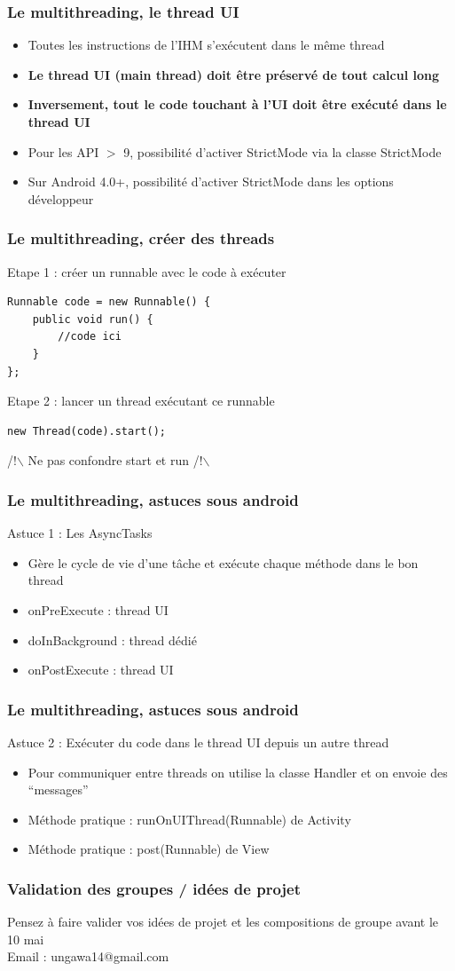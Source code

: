 \documentclass{beamer}
\begin{document}
\begin{frame}[fragile] 
\frametitle{Le multithreading, le thread UI}
\begin{itemize}
  \item Toutes les instructions de l'IHM s'exécutent dans le même thread
  \item \textbf{Le thread UI (main thread) doit être préservé de tout calcul
  long}
  \item \textbf{Inversement, tout le code touchant à l'UI doit être exécuté dans le thread UI}
  \item Pour les API $>$ 9, possibilité d'activer StrictMode via la classe StrictMode
  \item Sur Android 4.0+, possibilité d'activer StrictMode dans les options développeur
\end{itemize}
\end{frame}
\begin{frame}[fragile] 
\frametitle{Le multithreading, créer des threads}
Etape 1 : créer un runnable avec le code à exécuter
\begin{lstlisting}
Runnable code = new Runnable() {
    public void run() {
        //code ici
    }
};
\end{lstlisting}
Etape 2 : lancer un thread exécutant ce runnable
\begin{lstlisting}
new Thread(code).start();
\end{lstlisting}
/!$\backslash$ Ne pas confondre start et run /!$\backslash$
\end{frame}
\begin{frame}[fragile] 
\frametitle{Le multithreading, astuces sous android}
Astuce 1 : Les AsyncTasks
\begin{itemize}
  \item Gère le cycle de vie d'une tâche et exécute chaque méthode dans le bon thread
  \item onPreExecute : thread UI
  \item doInBackground : thread dédié
  \item onPostExecute : thread UI
\end{itemize}
\end{frame}
\begin{frame}[fragile] 
\frametitle{Le multithreading, astuces sous android}
Astuce 2 : Exécuter du code dans le thread UI depuis un autre thread
\begin{itemize}
  \item Pour communiquer entre threads on utilise la classe Handler et on envoie
  des ``messages''
  \item Méthode pratique : runOnUIThread(Runnable) de Activity
  \item Méthode pratique : post(Runnable) de View
\end{itemize}
\end{frame}
\begin{frame}[fragile] 
\frametitle{Validation des groupes / idées de projet}
Pensez à faire valider vos idées de projet et les compositions de groupe avant
le 10 mai\\
Email : ungawa14@gmail.com
\end{frame}
\end{document}
